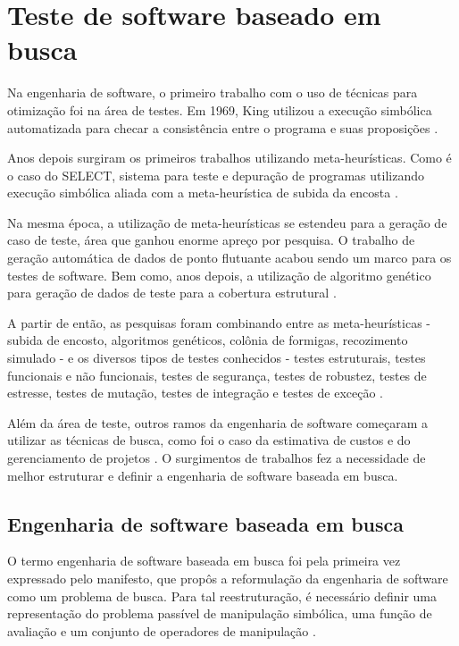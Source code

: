 \section{Teste de software baseado em busca}

Na engenharia de software, o primeiro trabalho com o uso de técnicas para otimização foi na área de testes. Em 1969, King utilizou a execução simbólica automatizada para checar a consistência entre o programa e suas proposições \cite{king1969program}. 

Anos depois surgiram os primeiros trabalhos utilizando meta-heurísticas. Como é o caso do SELECT, sistema para teste e depuração de programas utilizando execução simbólica aliada com a meta-heurística de subida da encosta \cite{boyer1975select}.

Na mesma época, a utilização de meta-heurísticas se estendeu para a geração de caso de teste, área que ganhou enorme apreço por pesquisa. O trabalho de geração automática de dados de ponto flutuante \cite{miller1976automatic} acabou sendo um marco para os testes de software. Bem como, anos depois, a utilização de algoritmo genético para geração de dados de teste para a cobertura estrutural \cite{xanthakis1992application}.

A partir de então, as pesquisas foram combinando entre as meta-heurísticas - subida de encosto, algoritmos genéticos, colônia de formigas, recozimento simulado - e os diversos tipos de testes  conhecidos - testes estruturais, testes funcionais e não funcionais, testes de segurança, testes de robustez, testes de estresse, testes de mutação, testes de integração e testes de exceção \cite{harman2009search}.

Além da área de teste, outros ramos da engenharia de software começaram a utilizar as técnicas de busca, como foi o caso da estimativa de custos e do gerenciamento de projetos \cite{de2011ten}. O surgimentos de trabalhos fez a necessidade de melhor estruturar e definir a engenharia de software baseada em busca.

\subsection{Engenharia de software baseada em busca}

O termo engenharia de software baseada em busca foi pela primeira vez expressado pelo manifesto, que propôs a reformulação da engenharia de software como um problema de busca. Para tal reestruturação, é necessário definir uma representação do problema passível de manipulação simbólica, uma função de avaliação e um conjunto de operadores de manipulação \cite{harman2001search}.

